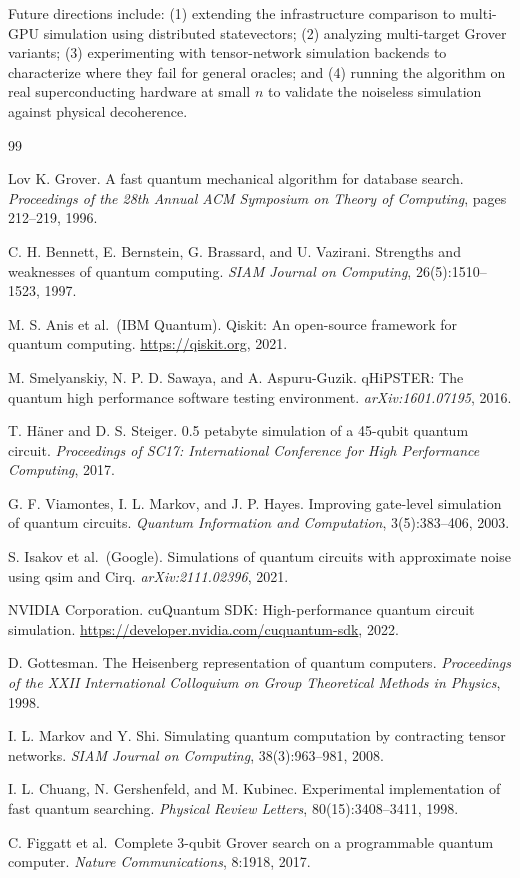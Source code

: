 \documentclass[sigconf, authorversion=true, nonacm=true]{acmart}
\begin{document}
Future directions include: (1) extending the infrastructure comparison to multi-GPU simulation using distributed statevectors; (2) analyzing multi-target Grover variants; (3) experimenting with tensor-network simulation backends to characterize where they fail for general oracles; and (4) running the algorithm on real superconducting hardware at small $n$ to validate the noiseless simulation against physical decoherence.

\begin{thebibliography}{99}

 Lov K. Grover. A fast quantum mechanical algorithm for database search. \textit{Proceedings of the 28th Annual ACM Symposium on Theory of Computing}, pages 212--219, 1996.

 C. H. Bennett, E. Bernstein, G. Brassard, and U. Vazirani. Strengths and weaknesses of quantum computing. \textit{SIAM Journal on Computing}, 26(5):1510--1523, 1997.

 M. S. Anis et al.\ (IBM Quantum). Qiskit: An open-source framework for quantum computing. \url{https://qiskit.org}, 2021.

 M. Smelyanskiy, N. P. D. Sawaya, and A. Aspuru-Guzik. qHiPSTER: The quantum high performance software testing environment. \textit{arXiv:1601.07195}, 2016.

 T. Häner and D. S. Steiger. 0.5 petabyte simulation of a 45-qubit quantum circuit. \textit{Proceedings of SC17: International Conference for High Performance Computing}, 2017.

 G. F. Viamontes, I. L. Markov, and J. P. Hayes. Improving gate-level simulation of quantum circuits. \textit{Quantum Information and Computation}, 3(5):383--406, 2003.

 S. Isakov et al.\ (Google). Simulations of quantum circuits with approximate noise using qsim and Cirq. \textit{arXiv:2111.02396}, 2021.

 NVIDIA Corporation. cuQuantum SDK: High-performance quantum circuit simulation. \url{https://developer.nvidia.com/cuquantum-sdk}, 2022.

 D. Gottesman. The Heisenberg representation of quantum computers. \textit{Proceedings of the XXII International Colloquium on Group Theoretical Methods in Physics}, 1998.

 I. L. Markov and Y. Shi. Simulating quantum computation by contracting tensor networks. \textit{SIAM Journal on Computing}, 38(3):963--981, 2008.

 I. L. Chuang, N. Gershenfeld, and M. Kubinec. Experimental implementation of fast quantum searching. \textit{Physical Review Letters}, 80(15):3408--3411, 1998.

 C. Figgatt et al.\ Complete 3-qubit Grover search on a programmable quantum computer. \textit{Nature Communications}, 8:1918, 2017.

\end{thebibliography}
\end{document}
